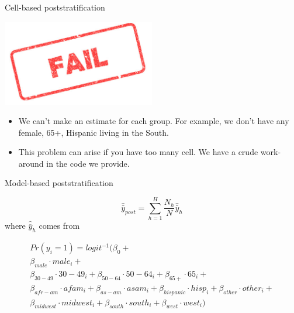 \documentclass[aspectratio=169]{beamer}
\begin{document}
\begin{frame}{Cell-based poststratification}

\begin{center}
\includegraphics[width=0.5\textwidth]{figures/fail}
\end{center}

\vfill

\begin{itemize}
\item We can't make an estimate for each group.  For example, we don't have any female, 65+, Hispanic living in the South. \pause
\item This problem can arise if you have too many cell.  We have a crude work-around in the code we provide. 
\end{itemize}

\end{frame}
\begin{frame}{Model-based poststratification}

\begin{equation*}
\hat{\bar{y}}_{post} = \sum_{h=1}^H \frac{N_h}{N} \hat{\bar{y}}_h
\end{equation*}
where
$\hat{\bar{y}}_h$ comes from

\begin{align*}
Pr(y_i = 1) = logit^{-1} (\beta_0 + \\
 \beta_{male} \cdot male_i+ \\
 \beta_{30-49} \cdot 30-49_i + \beta_{50 - 64} \cdot 50-64_i+ \beta_{65+} \cdot 65_i +\\
 \beta_{afr-am} \cdot afam_i + \beta_{as-am} \cdot asam_i+ \beta_{hispanic} \cdot hisp_i + \beta_{other} \cdot other_i + \\
 \beta_{midwest} \cdot midwest_i + \beta_{south} \cdot south_i + \beta_{west} \cdot west_i)
\end{align*}

\end{frame}
\end{document}
